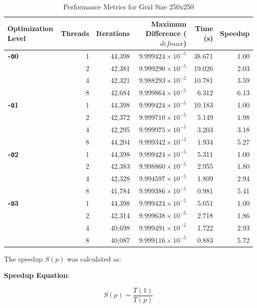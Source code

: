 \documentclass{article}
\begin{document}
\begin{table}[H]
    \centering
    \caption{Performance Metrics for Grid Size 250x250}
    \label{tab:performance_250}
    \begin{tabular}{l r r r r r}
    \toprule
    \textbf{Optimization Level} & \textbf{Threads} & \textbf{Iterations} & \textbf{Maximum Difference ($difmax$)} & \textbf{Time (s)} & \textbf{Speedup} \\
    \midrule
    \textbf{\texttt{-O}0} & 1 & 44,398 & $9.999424 \times 10^{-5}$ & 38.671 & 1.00 \\
        & 2 & 42,381 & $9.999290 \times 10^{-5}$ & 19.026 & 2.03 \\
        & 4 & 42,321 & $9.988293 \times 10^{-5}$ & 10.781 & 3.59 \\
        & 8 & 42,684 & $9.999864 \times 10^{-5}$ & 6.312 & 6.13 \\
    \midrule
    \textbf{\texttt{-O}1} & 1 & 44,398 & $9.999424 \times 10^{-5}$ & 10.183 & 1.00 \\
        & 2 & 42,372 & $9.999710 \times 10^{-5}$ & 5.149 & 1.98 \\
        & 4 & 42,295 & $9.999975 \times 10^{-5}$ & 3.203 & 3.18 \\
        & 8 & 44,204 & $9.999342 \times 10^{-5}$ & 1.934 & 5.27 \\
    \midrule
    \textbf{\texttt{-O}2} & 1 & 44,398 & $9.999424 \times 10^{-5}$ & 5.311 & 1.00 \\
        & 2 & 42,383 & $9.998860 \times 10^{-5}$ & 2.955 & 1.80 \\
        & 4 & 42,328 & $9.994597 \times 10^{-5}$ & 1.809 & 2.94 \\
        & 8 & 41,784 & $9.999386 \times 10^{-5}$ & 0.981 & 5.41 \\
    \midrule
    \textbf{\texttt{-O}3} & 1 & 44,398 & $9.999424 \times 10^{-5}$ & 5.051 & 1.00 \\
        & 2 & 42,314 & $9.999638 \times 10^{-5}$ & 2.718 & 1.86 \\
        & 4 & 40,698 & $9.999491 \times 10^{-5}$ & 1.722 & 2.93 \\
        & 8 & 40,087 & $9.999116 \times 10^{-5}$ & 0.883 & 5.72 \\
    \bottomrule
    \end{tabular}
\end{table}

The speedup $S(p)$ was calculated as:

\textbf{Speedup Equation}:

\[
S(p) = \frac{T(1)}{T(p)}
\]
\end{document}
